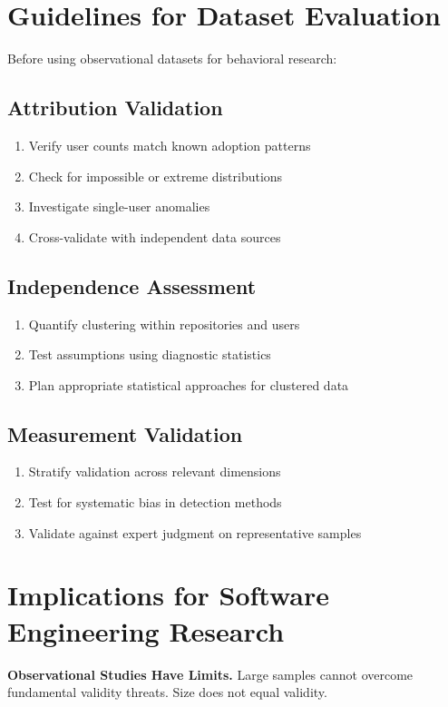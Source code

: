 \documentclass[conference]{IEEEtran}
\begin{document}
\section{Guidelines for Dataset Evaluation}
Before using observational datasets for behavioral research:

\subsection{Attribution Validation}
\begin{enumerate}
\item Verify user counts match known adoption patterns
\item Check for impossible or extreme distributions  
\item Investigate single-user anomalies
\item Cross-validate with independent data sources
\end{enumerate}

\subsection{Independence Assessment}
\begin{enumerate}
\item Quantify clustering within repositories and users
\item Test assumptions using diagnostic statistics
\item Plan appropriate statistical approaches for clustered data
\end{enumerate}

\subsection{Measurement Validation}
\begin{enumerate}
\item Stratify validation across relevant dimensions
\item Test for systematic bias in detection methods
\item Validate against expert judgment on representative samples
\end{enumerate}

\section{Implications for Software Engineering Research}

\textbf{Observational Studies Have Limits.} Large samples cannot overcome fundamental validity threats. Size does not equal validity.
\end{document}
